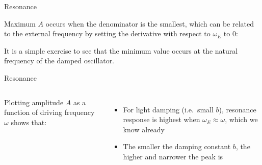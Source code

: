 \documentclass[12pt,compress,aspectratio=169]{beamer}
\begin{document}
\begin{frame}{Resonance}
  
  Maximum $A$ occurs when the denominator is the smallest, which can be related
  to the external frequency by setting the derivative with respect to
  $\omega_E$ to 0:


  It is a simple exercise
  to see that the minimum value occurs at the natural frequency of
  the damped oscillator.

%
%  
\end{frame}



\begin{frame}{Resonance}
  \begin{columns}

    Plotting amplitude $A$ as a function of driving frequency $\omega$ shows
    that:
    \begin{itemize}
    \item For light damping (i.e.\ small $b$), resonance response is highest
      when $\omega_E\approx\omega$, which we know already
    \item The smaller the damping constant $b$, the higher and narrower the
      peak is
    \end{itemize}
  \end{columns}
\end{frame}
\end{document}
